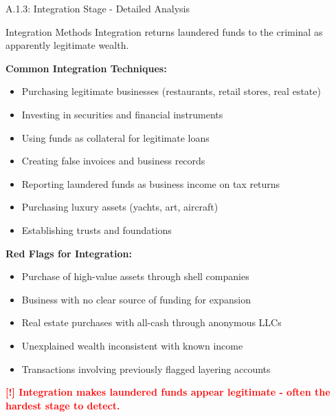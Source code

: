 \documentclass[11pt,a4paper]{beamer}
\newcommand{\redflag}[1]{\textcolor{red}{\textbf{[!] #1}}}
\begin{document}
	\begin{frame}{A.1.3: Integration Stage - Detailed Analysis}
		\begin{block}{Integration Methods}
			Integration returns laundered funds to the criminal as apparently legitimate wealth.
		\end{block}
		\textbf{Common Integration Techniques:}
		\begin{itemize}
			\item Purchasing legitimate businesses (restaurants, retail stores, real estate)
			\item Investing in securities and financial instruments
			\item Using funds as collateral for legitimate loans
			\item Creating false invoices and business records
			\item Reporting laundered funds as business income on tax returns
			\item Purchasing luxury assets (yachts, art, aircraft)
			\item Establishing trusts and foundations
		\end{itemize}
		\textbf{Red Flags for Integration:}
		\begin{itemize}
			\item Purchase of high-value assets through shell companies
			\item Business with no clear source of funding for expansion
			\item Real estate purchases with all-cash through anonymous LLCs
			\item Unexplained wealth inconsistent with known income
			\item Transactions involving previously flagged layering accounts
		\end{itemize}
		\redflag{Integration makes laundered funds appear legitimate - often the hardest stage to detect.}
	\end{frame}
	
\end{document}
